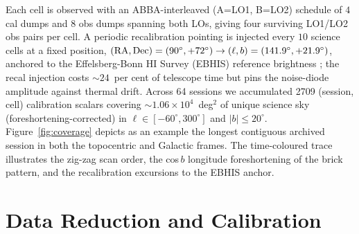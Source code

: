 \documentclass[10pt,preprint2]{aastex}
\begin{document}
Each cell is observed with an ABBA-interleaved (A=LO1, B=LO2) schedule of $4$ cal dumps and $8$ obs dumps spanning both LOs, giving four surviving LO1/LO2 obs pairs per cell. A periodic recalibration pointing is injected every $10$ science cells at a fixed position, $({\rm RA},{\rm Dec})=(90^\circ, +72^\circ) \to (\ell, b) = (141.9^\circ, +21.9^\circ)$, anchored to the Effelsberg-Bonn HI Survey (EBHIS) reference brightness \citep{EBHIS2016}; the recal injection costs $\sim 24$~per cent of telescope time but pins the noise-diode amplitude against thermal drift. Across 64 sessions we accumulated 2709 (session, cell) calibration scalars covering $\sim 1.06 \times 10^{4}$~deg$^{2}$ of unique science sky (foreshortening-corrected) in $\ell \in [-60^\circ, 300^\circ]$ and $|b|\le 20^\circ$. Figure~\ref{fig:coverage} depicts as an example the longest contiguous archived session in both the topocentric and Galactic frames. The time-coloured trace illustrates the zig-zag scan order, the cos$\,b$ longitude foreshortening of the brick pattern, and the recalibration excursions to the EBHIS anchor.

\section{Data Reduction and Calibration}
\label{sec:reduction}
\end{document}
